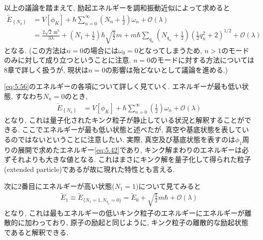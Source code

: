 \documentclass[dvipdfmx,11pt,a4paper,oneside,openany]{jsbook}
\begin{document}
以上の議論を踏まえて, 励起エネルギーを調和振動近似によって求めると
\begin{align}
    \tilde{E}_{\left\{N_{a}\right\}} & =V\left[\phi_{K}\right]+\hbar \sum_{n=0}^{\infty}\left(N_{n}+\frac{1}{2}\right) \omega_{n}+\mathcal{O}(\lambda)\label{eq:5.55}                                                                                                                 \\
                                     & =\frac{2 \sqrt{2} \mathrm{~m}^{3}}{3 \lambda}+\left(N_{1}+\frac{1}{2}\right) \hbar \sqrt{\frac{3}{2}} m+m \hbar \sum_{q_{n}}\left(N_{q_{n}}+\frac{1}{2}\right)\left(\frac{1}{2} q_{n}^{2}+2\right)^{1 / 2}+\mathcal{O}(\lambda)\label{eq:5.56}
\end{align}
となる. (この方法は$n=0$の場合には$\omega_0=0$となってしまうため, $n>1$のモードのみに対して成り立つということに注意. $n=0$のモードに対する方法については8章で詳しく扱うが, 現状は$n=0$の影響は殆どないとして議論を進める.)

\eqref{eq:5.56}のエネルギーの各項について詳しく見ていく. エネルギーが最も低い状態, すなわち$N_n=0$のとき,
\begin{align*}
    \tilde{E}_{\left\{N_{a}\right\}} & =V\left[\phi_{K}\right]+\hbar \sum_{n=0}^{\infty}\left(\frac{1}{2}\right) \omega_{n}+\mathcal{O}(\lambda)
\end{align*}
となり, これは量子化されたキンク粒子が静止している状況と解釈することができる. ここでエネルギーが最も低い状態と述べたが, 真空や基底状態を表しているのではないということに注意したい. 実際, 真空及び基底状態を表すのは$\phi_1$周りの展開で求めたエネルギー\eqref{eq:5.42}であり, キンク解まわりのエネルギーは必ずそれよりも大きな値となる. これはまさにキンク解を量子化して得られた粒子(extended particle)であるが故に現れた特性とも言える.

次に2番目にエネルギーが高い状態($N_1=1$)について見てみると
\begin{align*}
    \tilde{E}_1\equiv\tilde{E}_{\{N_1=1, N_{q_n}=0\}}=\tilde{E}_0+\sqrt{\frac{3}{2}}m\hbar+\mathcal{O}(\lambda)
\end{align*}
となり, これは最もエネルギーの低いキンク粒子のエネルギーにエネルギーが離散的に加わっており, 原子の励起と同じように, キンク粒子の離散的な励起状態であると解釈できる.
\end{document}
